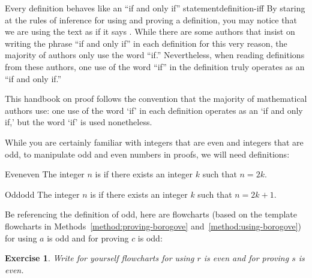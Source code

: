 \documentclass{book}
\newcounter{ekcounter}%
\theoremstyle{ekimcustom}
\newtheorem{exercise}[ekcounter]{Exercise}
\newcommand\defn[1]{{\color{blue}{\bf #1}}}
\begin{document}
\begin{blanguage}{Every definition behaves like an ``if and only if'' statement}{definition-iff}
By staring at the rules of inference for using and proving a definition, you may notice that we are using the text \fbox{$z$ is a \defn{borogove} if $P(z)$} as if it says \fbox{$z$ is a \defn{borogove} if and only if $P(z)$}. While there are some authors that insist on writing the phrase ``if and only if'' in each definition for this very reason, the majority of authors only use the word ``if.'' Nevertheless, when reading definitions from these authors, one use of the word ``if'' in the definition truly operates as an ``if and only if.''
\end{blanguage}
This handbook on proof follows the convention that the majority of mathematical authors use: one use of the word `if' in each definition operates as an `if and only if,' but the word `if' is used nonetheless.

While you are certainly familiar with integers that are even and integers that are odd, to manipulate odd and even numbers in proofs, we will need definitions:
\begin{bdefinition}{Even}{even}
The integer $n$ is \defn{even} if there exists an integer $k$ such that $n=2k$.
\end{bdefinition}
\begin{bdefinition}{Odd}{odd}
The integer $n$ is \defn{odd} if there exists an integer $k$ such that $n=2k+1$.
\end{bdefinition}
Be referencing the definition of odd, here are flowcharts (based on the template flowcharts in Methods~\ref{method:proving-borogove} and~\ref{method:using-borogove}) for using $a$ is odd and for proving $c$ is odd:
\begin{center}
\quad
{}
\end{center}
\begin{exercise}
Write for yourself flowcharts for using $r$ is even and for proving $s$ is even.
\end{exercise}
\end{document}
